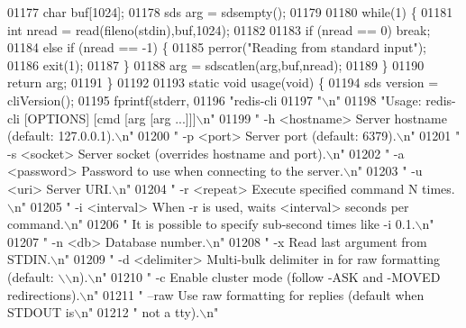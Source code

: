 \begin{DoxyCode}
{{{{{{{{{{{{{{{{{{{{{{{{{{{{{{{{01177     \textcolor{keywordtype}{char} buf[1024];
01178     sds arg = sdsempty();
01179 
01180     \textcolor{keywordflow}{while}(1) \{
01181         \textcolor{keywordtype}{int} nread = read(fileno(stdin),buf,1024);
01182 
01183         \textcolor{keywordflow}{if} (nread == 0) \textcolor{keywordflow}{break};
01184         \textcolor{keywordflow}{else} \textcolor{keywordflow}{if} (nread == -1) \{
01185             perror(\textcolor{stringliteral}{"Reading from standard input"});
01186             exit(1);
01187         \}
01188         arg = sdscatlen(arg,buf,nread);
01189     \}
01190     \textcolor{keywordflow}{return} arg;
01191 \}
01192 
01193 \textcolor{keyword}{static} \textcolor{keywordtype}{void} usage(\textcolor{keywordtype}{void}) \{
01194     sds version = cliVersion();
01195     fprintf(stderr,
01196 \textcolor{stringliteral}{"redis-cli %
01197 \textcolor{stringliteral}{"\(\backslash\)n"}
01198 \textcolor{stringliteral}{"Usage: redis-cli [OPTIONS] [cmd [arg [arg ...]]]\(\backslash\)n"}
01199 \textcolor{stringliteral}{"  -h <hostname>      Server hostname (default: 127.0.0.1).\(\backslash\)n"}
01200 \textcolor{stringliteral}{"  -p <port>          Server port (default: 6379).\(\backslash\)n"}
01201 \textcolor{stringliteral}{"  -s <socket>        Server socket (overrides hostname and port).\(\backslash\)n"}
01202 \textcolor{stringliteral}{"  -a <password>      Password to use when connecting to the server.\(\backslash\)n"}
01203 \textcolor{stringliteral}{"  -u <uri>           Server URI.\(\backslash\)n"}
01204 \textcolor{stringliteral}{"  -r <repeat>        Execute specified command N times.\(\backslash\)n"}
01205 \textcolor{stringliteral}{"  -i <interval>      When -r is used, waits <interval> seconds per command.\(\backslash\)n"}
01206 \textcolor{stringliteral}{"                     It is possible to specify sub-second times like -i 0.1.\(\backslash\)n"}
01207 \textcolor{stringliteral}{"  -n <db>            Database number.\(\backslash\)n"}
01208 \textcolor{stringliteral}{"  -x                 Read last argument from STDIN.\(\backslash\)n"}
01209 \textcolor{stringliteral}{"  -d <delimiter>     Multi-bulk delimiter in for raw formatting (default: \(\backslash\)\(\backslash\)n).\(\backslash\)n"}
01210 \textcolor{stringliteral}{"  -c                 Enable cluster mode (follow -ASK and -MOVED redirections).\(\backslash\)n"}
01211 \textcolor{stringliteral}{"  --raw              Use raw formatting for replies (default when STDOUT is\(\backslash\)n"}
01212 \textcolor{stringliteral}{"                     not a tty).\(\backslash\)n"}
}}}}}}}}}}}}}}}}}}}}}}}}}}}}}}}}}
\end{DoxyCode}
